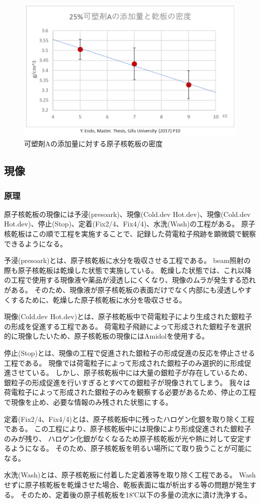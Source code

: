 \documentclass[12pt,a4paper]{jarticle}
\begin{document}
\begin{figure}[htbp]
  \centering
     \includegraphics[width=140mm]{kasozai.png}
  \caption{可塑剤Aの添加量に対する原子核乾板の密度\label{fig:kasozai}}
\end{figure}
\newpage
\subsection{現像}
\subsubsection{原理}
原子核乾板の現像には予浸(presoark)、現像(Cold.dev Hot.dev)、現像(Cold.dev Hot.dev)、停止(Stop)、定着(Fix2/4、Fix4/4)、水洗(Wash)の工程がある。
原子核乾板はこの順で工程を実施することで、記録した荷電粒子飛跡を顕微鏡で観察できるようになる。
\par
予浸(presoark)とは、原子核乾板に水分を吸収させる工程である。
beam照射の際も原子核乾板は乾燥した状態で実施している。
乾燥した状態では、これ以降の工程で使用する現像液や薬品が浸透しにくくなり、現像のムラが発生する恐れがある。
そのため、現像液が原子核乾板の表面だけでなく内部にも浸透しやすくするために、乾燥した原子核乾板に水分を吸収させる。
\par
現像(Cold.dev Hot.dev)とは、原子核乾板中で荷電粒子により生成された銀粒子の形成を促進する工程である。
荷電粒子飛跡によって形成された銀粒子を選択的に現像したいため、原子核乾板の現像にはAmidolを使用する。
\par
停止(Stop)とは、現像の工程で促進された銀粒子の形成促進の反応を停止させる工程である。
現像では荷電粒子によって形成された銀粒子のみ選択的に形成促進させている。
しかし、原子核乾板中には大量の銀粒子が存在しているため、銀粒子の形成促進を行いすぎるとすべての銀粒子が現像されてしまう。
我々は荷電粒子によって形成された銀粒子のみを観察する必要があるため、停止の工程で現像を止め、必要な情報のみ残された状態にする。
\par
定着(Fix2/4、Fix4/4)とは、原子核乾板中に残ったハロゲン化銀を取り除く工程である。
この工程により、原子核乾板中には現像により形成促進された銀粒子のみが残り、
ハロゲン化銀がなくなるため原子核乾板が光や熱に対して安定するようになる。
そのため、原子核乾板を明るい場所にて取り扱うことが可能になる。
\par
水洗(Wash)とは、原子核乾板に付着した定着液等を取り除く工程である。
Washせずに原子核乾板を乾燥させた場合、乾板表面に塩が析出する等の問題が発生する。
そのため、定着後の原子核乾板を18℃以下の多量の流水に漬け洗浄する。
\end{document}
